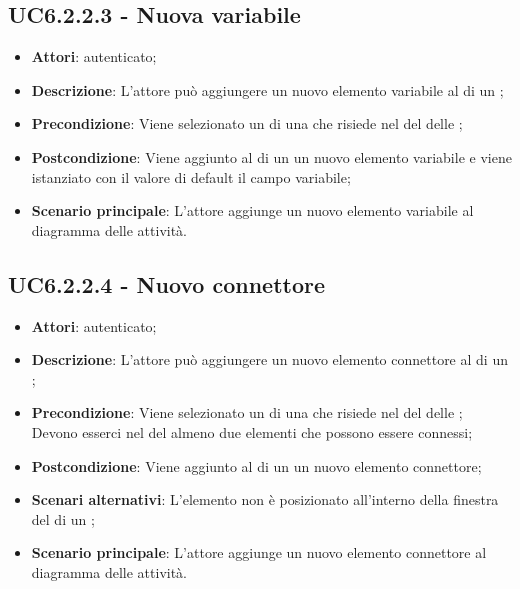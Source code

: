 \subsection{UC6.2.2.3 - Nuova variabile}
\label{ssec:UC6.2.2.3}
\begin{itemize}
\item \textbf{Attori}:  autenticato;
\item \textbf{Descrizione}: L'attore può aggiungere un nuovo elemento variabile al  di un ;
\item \textbf{Precondizione}: Viene selezionato un  di una  che risiede nel  del  delle  ;
\item \textbf{Postcondizione}: Viene aggiunto al  di un  un nuovo elemento variabile e viene istanziato con il valore di default il campo variabile;
\item \textbf{Scenario principale}: L'attore aggiunge un nuovo elemento variabile al diagramma delle attività.
\end{itemize}
\subsection{UC6.2.2.4 - Nuovo connettore}
\label{ssec:UC6.2.2.4}
\begin{itemize}
\item \textbf{Attori}:  autenticato;
\item \textbf{Descrizione}: L'attore può aggiungere un nuovo elemento connettore al  di un ;
\item \textbf{Precondizione}: Viene selezionato un  di una  che risiede nel  del  delle  ; Devono esserci nel  del  almeno due elementi che possono essere connessi;
\item \textbf{Postcondizione}: Viene aggiunto al  di un  un nuovo elemento connettore;
\item \textbf{Scenari alternativi}: L'elemento non è posizionato all'interno della finestra del  di un ;
\item \textbf{Scenario principale}: L'attore aggiunge un nuovo elemento connettore al diagramma delle attività.
\end{itemize}
